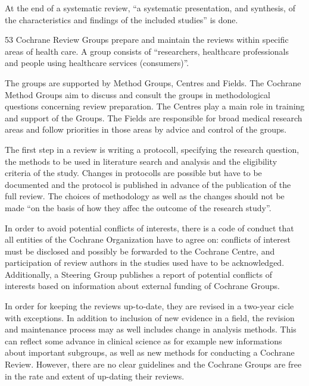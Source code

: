\documentclass[11pt,a4paper,twoside]{book}\usepackage[]{graphicx}\usepackage[]{color}
\begin{document}
At the end of a systematic review, ``a systematic presentation, and synthesis, of the characteristics and findings of the included studies'' is done. 

\vspace{0mm}
53 Cochrane Review Groups prepare and maintain the reviews within specific areas of health care. A group consists of ``researchers, healthcare professionals and people using healthcare services (consumers)''.

\vspace{0mm}
The groups are supported by Method Groups, Centres and Fields. The Cochrane Method Groups aim to discuss and consult the groups in methodological questions concerning review preparation. The Centres play a main role in training and support of the Groups. The Fields are responsible for broad medical research areas and follow priorities in those areas by advice and control of the groups.

\vspace{0mm}
The first step in a review is writing a protocoll, specifying the research question, the methods to be used in literature search and analysis and the eligibility criteria of the study. Changes in protocolls are possible but have to be documented and the protocol is published in advance of the publication of the full review. The choices of methodology as well as the changes should not be made ``on the basis of how they affec the outcome of the research study''.

\vspace{0mm}
In order to avoid potential conflicts of interests, there is a code of conduct that all entities of the Cochrane Organization have to agree on: conflicts of interest must be disclosed and possibly be forwarded to the Cochrane Centre, and participation of review authors in the studies used have to be acknowledged. Additionally, a Steering Group publishes a report of potential conflicts of interests based on information about external funding of Cochrane Groups.

\vspace{0mm}
In order for keeping the reviews up-to-date, they are revised in a two-year cicle with exceptions. In addition to inclusion of new evidence in a field, the revision and maintenance process may as well includes change in analysis methods. This can reflect some advance in clinical science as for example new informations about important subgroups, as well as new methods for conducting a Cochrane Review. However, there are no clear guidelines and the Cochrane Groups are free in the rate and extent of up-dating their reviews.
\end{document}
